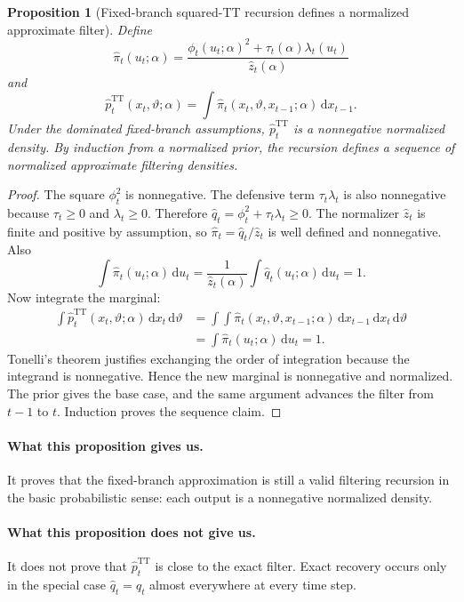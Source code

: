 \documentclass[11pt]{article}
\newcommand{\dd}{\mathrm{d}}
\newcommand{\TT}{\mathrm{TT}}
\newtheorem{proposition}{Proposition}
\theoremstyle{definition}
\theoremstyle{remark}
\begin{document}
\begin{proposition}[Fixed-branch squared-TT recursion defines a normalized approximate filter]
Define
\[
  \widehat\pi_t(u_t;\alpha)
  =
  \frac{\phi_t(u_t;\alpha)^2+\tau_t(\alpha)\lambda_t(u_t)}
       {\widehat z_t(\alpha)}
\]
and
\[
  \widehat p_t^{\TT}(x_t,\vartheta;\alpha)
  =
  \int
  \widehat\pi_t(x_t,\vartheta,x_{t-1};\alpha)\,\dd x_{t-1}.
\]
Under the dominated fixed-branch assumptions,
\(\widehat p_t^{\TT}\) is a nonnegative normalized density.  By induction from
a normalized prior, the recursion defines a sequence of normalized
approximate filtering densities.
\end{proposition}

\begin{proof}
The square \(\phi_t^2\) is nonnegative.  The defensive term
\(\tau_t\lambda_t\) is also nonnegative because \(\tau_t\ge0\) and
\(\lambda_t\ge0\).  Therefore \(\widehat q_t=\phi_t^2+\tau_t\lambda_t\ge0\).
The normalizer \(\widehat z_t\) is finite and positive by assumption, so
\(\widehat\pi_t=\widehat q_t/\widehat z_t\) is well defined and nonnegative.
Also
\[
  \int\widehat\pi_t(u_t;\alpha)\,\dd u_t
  =
  \frac{1}{\widehat z_t(\alpha)}
  \int \widehat q_t(u_t;\alpha)\,\dd u_t
  =
  1.
\]
Now integrate the marginal:
\[
\begin{aligned}
  \int\widehat p_t^{\TT}(x_t,\vartheta;\alpha)
  \,\dd x_t\,\dd\vartheta
  &=
  \int\int
  \widehat\pi_t(x_t,\vartheta,x_{t-1};\alpha)
  \,\dd x_{t-1}\,\dd x_t\,\dd\vartheta\\
  &=
  \int\widehat\pi_t(u_t;\alpha)\,\dd u_t
  =
  1.
\end{aligned}
\]
Tonelli's theorem justifies exchanging the order of integration because the
integrand is nonnegative.  Hence the new marginal is nonnegative and
normalized.  The prior gives the base case, and the same argument advances the
filter from \(t-1\) to \(t\).  Induction proves the sequence claim.
\end{proof}

\paragraph{What this proposition gives us.}
It proves that the fixed-branch approximation is still a valid filtering
recursion in the basic probabilistic sense: each output is a nonnegative
normalized density.

\paragraph{What this proposition does not give us.}
It does not prove that \(\widehat p_t^{\TT}\) is close to the exact filter.
Exact recovery occurs only in the special case
\(\widehat q_t=q_t\) almost everywhere at every time step.
\end{document}
